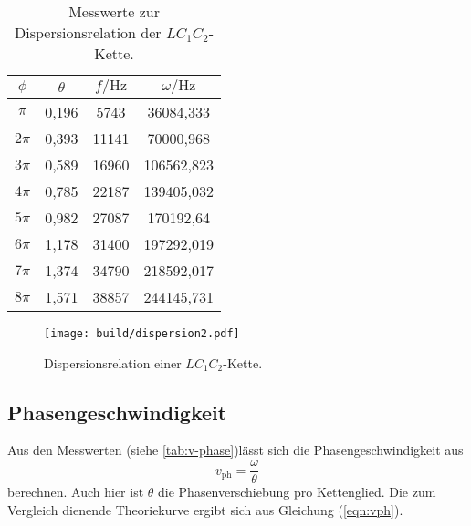 \begin{table}
  \centering
  \caption{Messwerte zur Dispersionsrelation der $LC_{1}C_{2}$-Kette.}
  \label{tab:dispersion2}
  \begin{tabular}{c c c c}
    \toprule
    $\phi$ & $\theta$ & $f / \si{\hertz}$ & $\omega / \si{\hertz}$ \\
    \midrule
    $\pi$ & 0,196 & 5743 & 36084,333 \\
    $2\pi$ & 0,393 & 11141 & 70000,968 \\
    $3\pi$ & 0,589 & 16960 & 106562,823 \\
    $4\pi$ & 0,785 & 22187 & 139405,032 \\
    $5\pi$ & 0,982 & 27087 & 170192,64 \\
    $6\pi$ & 1,178 & 31400 & 197292,019 \\
    $7\pi$ & 1,374 & 34790 & 218592,017 \\
    $8\pi$ & 1,571 & 38857 & 244145,731 \\
    \bottomrule
    \end{tabular}
  \end{table}

  \begin{figure}
    \centering
    \texttt{[image: build/dispersion2.pdf]}
  \caption{Dispersionsrelation einer $LC_{1}C_{2}$-Kette.}
    \label{fig:dispersion-lc1c2}
  \end{figure}

  \subsection{Phasengeschwindigkeit}
  Aus den Messwerten (siehe \ref{tab:v-phase})lässt sich die Phasengeschwindigkeit aus
  \begin{equation}
    v_\mathrm{ph} = \frac{\omega}{\theta}
  \end{equation}
  berechnen. Auch hier ist $\theta$ die Phasenverschiebung pro Kettenglied.
  Die zum Vergleich dienende Theoriekurve ergibt sich aus Gleichung (\ref{eqn:vph}).


